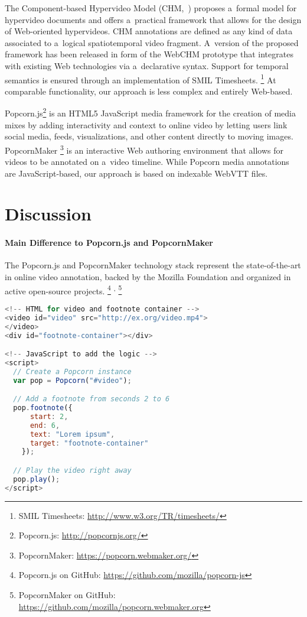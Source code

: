 \documentclass{sig-alternate}
\newcommand{\inlinelistingsize}{\fontsize{8pt}{11pt}}
\let\oldurl\url
\renewcommand{\url}[1]{\inlinelistingsize\oldurl{#1}}
\begin{document}
The Component-based Hypervideo Model
(CHM,~\cite{sadallah2012hypervideo})
proposes a~formal model for hypervideo documents
and offers a~practical framework that allows for
the design of Web-oriented hypervideos.
CHM annotations are defined as any kind of data associated to
a~logical spatiotemporal video fragment.
A~version of the proposed framework
has been released in form of the WebCHM prototype
that integrates with existing Web technologies
via a~declarative syntax.
Support for temporal semantics is ensured through
an implementation of SMIL Timesheets.%
\footnote{SMIL Timesheets:
\url{http://www.w3.org/TR/timesheets/}}
At comparable functionality, our approach is less complex
and entirely Web-based.

Popcorn.js\footnote{Popcorn.js: \url{http://popcornjs.org/}}
is an HTML5 JavaScript media framework
for the creation of media mixes
by adding interactivity and context to online video
by letting users link social media, feeds,
visualizations, and other content directly to moving images.
PopcornMaker%
\footnote{PopcornMaker: \url{https://popcorn.webmaker.org/}}
is an interactive Web authoring environment
that allows for videos to be annotated on a~video timeline.
While Popcorn media annotations are JavaScript-based,
our approach is based on indexable WebVTT files.

\section{Discussion}

\paragraph{Main Difference to Popcorn.js and PopcornMaker}

The Popcorn.js and PopcornMaker technology stack
represent the state-of-the-art in online video annotation,
backed by the Mozilla Foundation
and organized in active open-source projects.%
\footnote{Popcorn.js on GitHub: \url{https://github.com/mozilla/popcorn-js}}%
\textsuperscript{,}%
\footnote{PopcornMaker on GitHub: \url{https://github.com/mozilla/popcorn.webmaker.org}}

\begin{lstlisting}[caption={Minimal official Popcorn.js example, adapted from \url{http://jsfiddle.net/rwaldron/xhXE6/}},
  label=listing:popcorn, float=t!, language=JavaScript]
<!-- HTML for video and footnote container -->
<video id="video" src="http://ex.org/video.mp4">
</video>
<div id="footnote-container"></div>

<!-- JavaScript to add the logic -->
<script>
  // Create a Popcorn instance
  var pop = Popcorn("#video");

  // Add a footnote from seconds 2 to 6
  pop.footnote({
      start: 2,
      end: 6,
      text: "Lorem ipsum",
      target: "footnote-container"
    });

  // Play the video right away
  pop.play();
</script>
\end{lstlisting}
\end{document}
